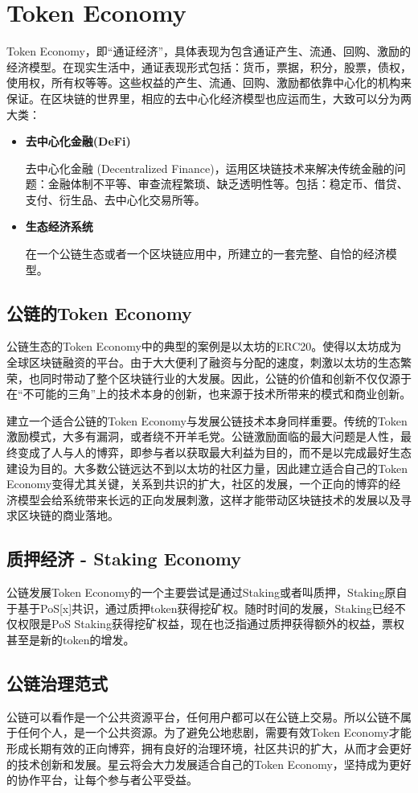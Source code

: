\section{Token Economy}
Token Economy，即“通证经济”，具体表现为包含通证产生、流通、回购、激励的经济模型。在现实生活中，通证表现形式包括：货币，票据，积分，股票，债权，使用权，所有权等等。这些权益的产生、流通、回购、激励都依靠中心化的机构来保证。在区块链的世界里，相应的去中心化经济模型也应运而生，大致可以分为两大类：

\begin{itemize}

	\item \textbf{去中心化金融(DeFi)}

	去中心化金融 (Decentralized Finance)，运用区块链技术来解决传统金融的问题：金融体制不平等、审查流程繁琐、缺乏透明性等。包括：稳定币、借贷、支付、衍生品、去中心化交易所等。

	\item \textbf{生态经济系统}

	在一个公链生态或者一个区块链应用中，所建立的一套完整、自恰的经济模型。

\end{itemize}

\subsection{公链的Token Economy}

公链生态的Token Economy中的典型的案例是以太坊的ERC20。使得以太坊成为全球区块链融资的平台。由于大大便利了融资与分配的速度，刺激以太坊的生态繁荣，也同时带动了整个区块链行业的大发展。因此，公链的价值和创新不仅仅源于在“不可能的三角”上的技术本身的创新，也来源于技术所带来的模式和商业创新。

建立一个适合公链的Token Economy与发展公链技术本身同样重要。传统的Token激励模式，大多有漏洞，或者绕不开羊毛党。公链激励面临的最大问题是人性，最终变成了人与人的博弈，即参与者以获取最大利益为目的，而不是以完成最好生态建设为目的。大多数公链远达不到以太坊的社区力量，因此建立适合自己的Token Economy变得尤其关键，关系到共识的扩大，社区的发展，一个正向的博弈的经济模型会给系统带来长远的正向发展刺激，这样才能带动区块链技术的发展以及寻求区块链的商业落地。

\subsection{质押经济 - Staking Economy}
公链发展Token Economy的一个主要尝试是通过Staking或者叫质押，Staking原自于基于PoS[x]共识，通过质押token获得挖矿权。随时时间的发展，Staking已经不仅权限是PoS Staking获得挖矿权益，现在也泛指通过质押获得额外的权益，票权甚至是新的token的增发。

\subsection{公链治理范式}
公链可以看作是一个公共资源平台，任何用户都可以在公链上交易。所以公链不属于任何个人，是一个公共资源。为了避免公地悲剧，需要有效Token Economy才能形成长期有效的正向博弈，拥有良好的治理环境，社区共识的扩大，从而才会更好的技术创新和发展。星云将会大力发展适合自己的Token Economy，坚持成为更好的协作平台，让每个参与者公平受益。
